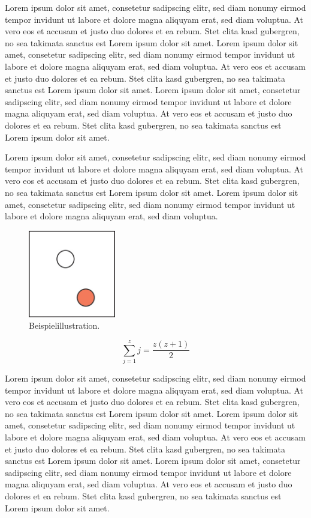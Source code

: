 \documentclass[journal]{vgtc}
\begin{document}
Lorem ipsum dolor sit amet, consetetur sadipscing elitr, sed diam
nonumy eirmod tempor invidunt ut labore et dolore magna aliquyam erat,
sed diam voluptua. At vero eos et accusam et justo duo dolores et ea
rebum. Stet clita kasd gubergren, no sea takimata sanctus est Lorem
ipsum dolor sit amet. Lorem ipsum dolor sit amet, consetetur
sadipscing elitr, sed diam nonumy eirmod tempor invidunt ut labore et
dolore magna aliquyam erat, sed diam voluptua. At vero eos et accusam
et justo duo dolores et ea rebum. Stet clita kasd gubergren, no sea
takimata sanctus est Lorem ipsum dolor sit amet. Lorem ipsum dolor sit
amet, consetetur sadipscing elitr, sed diam nonumy eirmod tempor
invidunt ut labore et dolore magna aliquyam erat, sed diam
voluptua. At vero eos et accusam et justo duo dolores et ea
rebum. Stet clita kasd gubergren, no sea takimata sanctus est Lorem
ipsum dolor sit amet.

Lorem ipsum dolor sit amet, consetetur sadipscing elitr, sed diam
nonumy eirmod tempor invidunt ut labore et dolore magna aliquyam erat,
sed diam voluptua. At vero eos et accusam et justo duo dolores et ea
rebum. Stet clita kasd gubergren, no sea takimata sanctus est Lorem
ipsum dolor sit amet. Lorem ipsum dolor sit amet, consetetur
sadipscing elitr, sed diam nonumy eirmod tempor invidunt ut labore et
dolore magna aliquyam erat, sed diam voluptua.


\begin{figure}[tb]
  \centering
  \includegraphics[width=1.5in]{sample}
  \caption{\label{fig:sample} Beispielillustration.}
\end{figure}

\begin{equation}
  \sum_{j=1}^{z} j = \frac{z(z+1)}{2}
\end{equation}

Lorem ipsum dolor sit amet, consetetur sadipscing elitr, sed diam
nonumy eirmod tempor invidunt ut labore et dolore magna aliquyam erat,
sed diam voluptua. At vero eos et accusam et justo duo dolores et ea
rebum. Stet clita kasd gubergren, no sea takimata sanctus est Lorem
ipsum dolor sit amet. Lorem ipsum dolor sit amet, consetetur
sadipscing elitr, sed diam nonumy eirmod tempor invidunt ut labore et
dolore magna aliquyam erat, sed diam voluptua. At vero eos et accusam
et justo duo dolores et ea rebum. Stet clita kasd gubergren, no sea
takimata sanctus est Lorem ipsum dolor sit amet. Lorem ipsum dolor sit
amet, consetetur sadipscing elitr, sed diam nonumy eirmod tempor
invidunt ut labore et dolore magna aliquyam erat, sed diam
voluptua. At vero eos et accusam et justo duo dolores et ea
rebum. Stet clita kasd gubergren, no sea takimata sanctus est Lorem
ipsum dolor sit amet.
\end{document}

